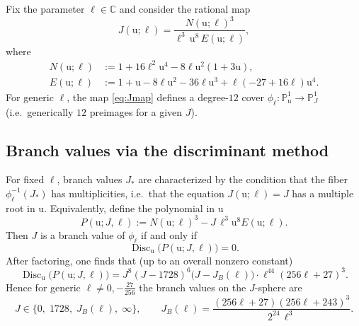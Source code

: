 \documentclass[11pt, a4paper]{article}
\newcommand{\ur}{\mathrm{u}}
\newcommand{\C}{\mathbb{C}}
\newcommand{\PP}{\mathbb{P}}
\DeclareMathOperator{\Disc}{Disc} %
\numberwithin{equation}{section}
\begin{document}
Fix the parameter $\ell \in \C$ and consider the rational map
\begin{equation}
\label{eq:Jmap}
J(\ur;\ell)
=
\frac{N(\ur;\ell)^3}{\ell^3\,\ur^8\,E(\ur;\ell)},
\end{equation}
where
\begin{align}
\label{eq:Nu}
N(\ur;\ell)
&:=1+16\ell^2 \ur^4-8\ell \ur^2(1+3\ur),
\\
\label{eq:Eu}
E(\ur;\ell)
&:=1+\ur-8\ell \ur^2-36\ell \ur^3+\ell(-27+16\ell)\ur^4.
\end{align}
For generic $\ell$, the map \eqref{eq:Jmap} defines a degree-$12$ cover
\(
\phi_\ell:\PP^1_\ur \to \PP^1_J
\)
(i.e.\ generically $12$ preimages for a given $J$).

\subsection{Branch values via the discriminant method}
For fixed $\ell$, branch values $J_\ast$ are characterized by the condition that the fiber
\(
\phi_\ell^{-1}(J_\ast)
\)
has multiplicities, i.e.\ that the equation $J(\ur;\ell)=J$ has a multiple root in $\ur$.
Equivalently, define the polynomial in $\ur$
\begin{equation}
\label{eq:Pu}
P(\ur;J,\ell):=N(\ur;\ell)^3 - J\,\ell^3 \ur^8 E(\ur;\ell).
\end{equation}
Then $J$ is a branch value of $\phi_\ell$ if and only if
\begin{equation}
\label{eq:disc-condition}
\Disc_\ur\bigl(P(\ur;J,\ell)\bigr)=0.
\end{equation}
After factoring, one finds that (up to an overall nonzero constant)
\begin{equation}
\label{eq:disc-factor}
\Disc_\ur\bigl(P(\ur;J,\ell)\bigr)
=
J^{8}(J-1728)^{6}\bigl(J-J_B(\ell)\bigr)\cdot \ell^{44}(256\ell+27)^3.
\end{equation}
Hence for generic $\ell\neq 0,-\tfrac{27}{256}$ the branch values on the $J$-sphere are
\begin{equation}
\label{eq:branchvalues-generic}
J \in \{0,\;1728,\;J_B(\ell),\;\infty\},
\qquad
J_B(\ell)=\frac{(256\ell+27)(256\ell+243)^3}{2^{24}\,\ell^3}.
\end{equation}
\end{document}
